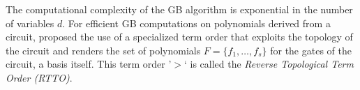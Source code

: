 



The computational complexity of the GB algorithm is exponential
in the number of variables $d$.
For efficient GB computations on polynomials derived from a circuit,
\cite{lv:tcad2013} proposed the use of a specialized term order that
exploits the topology of the circuit and renders the set of polynomials $F=\{f_1,\dots,f_s\}$ for 
the gates of the circuit, a \Grobner basis itself. 
This term order '$>$`
is called the {\it Reverse Topological Term Order (RTTO)}.

